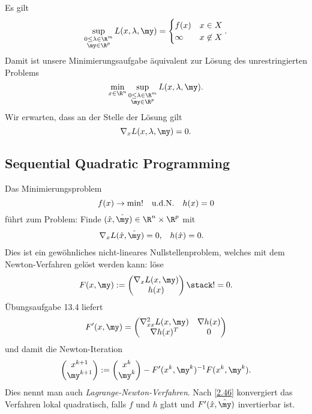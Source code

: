 \begin{nt} \label{3.29}
	Es gilt
	\[
		\sup_{\substack{0\le \lambda \in \R^m \\ \my \in \R^p}} L(x,\lambda,\my)
		= \begin{cases}
			f(x) & x \in X \\
			\infty & x \not\in X
		\end{cases}.
	\]
	Damit ist unsere Minimierungsaufgabe äquivalent zur Lösung des unrestringierten Problems
	\[
		\min_{x\in \R^n} \sup_{\substack{0\le \lambda \in \R^m \\ \my \in \R^p}} L(x,\lambda,\my).
	\]
	Wir erwarten, dass an der Stelle der Lösung gilt
	\[
		\nabla_x L(x, \lambda, \my) = 0.
	\]
\end{nt}

\subsection{Sequential Quadratic Programming}

Das Minimierungsproblem
\[
	f(x) \to \min! \quad\text{u.d.N.}\quad h(x) = 0
\]
führt zum Problem:
Finde $(\hat x, \hat \my) \in \R^n \times \R^p$ mit
\begin{align*}
	\nabla_x L(\hat x, \hat \my) &= 0, & h(\hat x) &= 0.
\end{align*}
Dies ist ein gewöhnliches nicht-lineares Nullstellenproblem, welches mit dem Newton-Verfahren gelöst werden kann: löse
\[
	F(x,\my) :=
	\begin{pmatrix}
		\nabla_x L(x, \my) \\
		h(x)
	\end{pmatrix}
	\stack != 0.
\]
Übungsaufgabe 13.4 %
liefert
\[
	F'(x, \my) =
	\begin{pmatrix}
		\nabla_{xx}^2 L(x,\my) & \nabla h(x) \\
		\nabla h(x)^T & 0
	\end{pmatrix}
\]
und damit die Newton-Iteration
\[
	\begin{pmatrix}
		x^{k+1} \\
		\my^{k+1}
	\end{pmatrix}
	:= \begin{pmatrix}
		x^k \\
		\my^k
	\end{pmatrix}
	- F'(x^k,\my^k)^{-1} F(x^k, \my^k).
\]
Dies nennt man auch \emph{Lagrange-Newton-Verfahren}.
Nach \ref{2.46} konvergiert das Verfahren lokal quadratisch, falls $f$ und $h$ glatt und $F'(\hat x, \hat \my)$ invertierbar ist.

